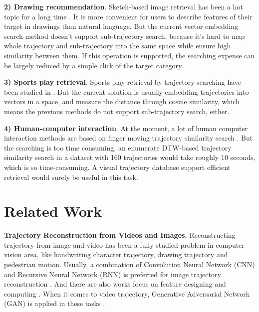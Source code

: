 \documentclass[sigconf]{acmart}
\begin{document}
\noindent
\textbf{2) Drawing recommendation}. Sketch-based image retrieval has been a hot topic for a long time \cite{SangkloyBHH16}. It is more convenient for users to describe features of their target in drawings than natural language.  But the current vector embedding search method doesn't support sub-trajectory search, because it's hard to map whole trajectory and sub-trajectory into the same space while ensure high similarity between them. If this operation is supported, the searching expense can be largely reduced by a simple click of the target category. 

\noindent
\textbf{3) Sports play retrieval}. Sports play retrieval by trajectory searching have been studied in \cite{DBLP:conf/kdd/WangLCJ19, iui/ShaLYCRM16}. But the current solution is usually embedding trajectories into vectors in a space, and measure the distance through cosine similarity, which means the previous methods do not support sub-trajectory search, either.

\noindent
\textbf{4) Human-computer interaction}. At the moment, a lot of human computer interaction methods are based on finger moving trajectory similarity search \cite{VikramLR13}. But the searching is too time consuming, an enumerate DTW-based trajectory similarity search in a dataset with 160 trajectories would take roughly 10 seconds, which is so time-consuming. A visual trajectory database support efficient retrieval would surely be useful in this task.  

\section{Related Work}
\noindent
\textbf{Trajectory Reconstruction from Videos and Images.} 
Reconstructing trajectory from image and video has been a fully studied problem in computer vision area, like handwriting character trajectory, drawing trajectory and pedestrian motion. Usually, a combination of Convolution Neural Network (CNN) and Recursive Neural Network (RNN) is preferred for image trajectory reconstruction \cite{ICPRtraj}. And there are also works focus on feature designing and computing \cite{CVPR/videotrackds}. When it comes to video trajectory, Generative Adversarial Network (GAN) is applied in these tasks \cite{GuptaJFSA18}. 
\end{document}
